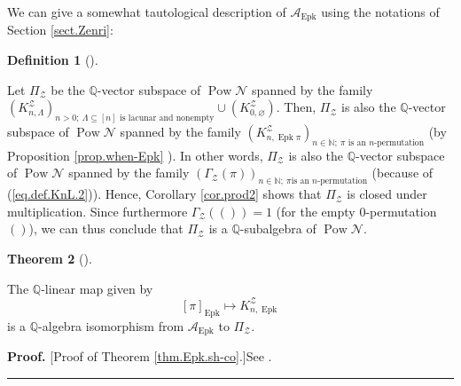 \documentclass[numbers=enddot,12pt,final,onecolumn,notitlepage]{scrartcl}%
\theoremstyle{definition}
\newtheorem{theo}{Theorem}[section]
\newenvironment{theorem}[1][]
{\begin{theo}[#1]\begin{leftbar}}
{\end{leftbar}\end{theo}}
\newtheorem{defi}[theo]{Definition}
\newenvironment{definition}[1][]
{\begin{defi}[#1]\begin{leftbar}}
{\end{leftbar}\end{defi}}
\newenvironment{proof}[1][Proof]{\noindent\textbf{#1.} }{\ \rule{0.5em}{0.5em}}
\newenvironment{vershort}{}{}
\begin{document}
We can give a somewhat tautological description of $\mathcal{A}%
_{\operatorname*{Epk}}$ using the notations of Section \ref{sect.Zenri}:

\begin{definition}
Let $\Pi_{\mathcal{Z}}$ be the $\mathbb{Q}$-vector subspace of
$\operatorname*{Pow}\mathcal{N}$ spanned by the family $\left(  K_{n,\Lambda
}^{\mathcal{Z}}\right)  _{n>0;\ \Lambda\subseteq\left[  n\right]  \text{ is
lacunar and nonempty}}\cup\left(  K_{0,\varnothing}^{\mathcal{Z}}\right)  $.
Then, $\Pi_{\mathcal{Z}}$ is also the $\mathbb{Q}$-vector subspace of
$\operatorname*{Pow}\mathcal{N}$ spanned by the family $\left(
K_{n,\operatorname*{Epk}\pi}^{\mathcal{Z}}\right)  _{n\in\mathbb{N}%
;\ \pi\text{ is an }n\text{-permutation}}$ (by Proposition \ref{prop.when-Epk}%
). In other words, $\Pi_{\mathcal{Z}}$ is also the $\mathbb{Q}$-vector
subspace of $\operatorname*{Pow}\mathcal{N}$ spanned by the family $\left(
\Gamma_{\mathcal{Z}}\left(  \pi\right)  \right)  _{n\in\mathbb{N};\ \pi\text{
is an }n\text{-permutation}}$ (because of (\ref{eq.def.KnL.2})). Hence,
Corollary \ref{cor.prod2} shows that $\Pi_{\mathcal{Z}}$ is closed under
multiplication. Since furthermore $\Gamma_{\mathcal{Z}}\left(
\left( \right) \right)  =1$ (for the empty $0$-permutation
$\left( \right)$), we can thus conclude that $\Pi
_{\mathcal{Z}}$ is a $\mathbb{Q}$-subalgebra of $\operatorname*{Pow}%
\mathcal{N}$.
\end{definition}

\begin{theorem}
\label{thm.Epk.sh-co}The $\mathbb{Q}$-linear map given by%
\[
\left[  \pi\right]  _{\operatorname*{Epk}}\mapsto K_{n,\operatorname*{Epk}%
}^{\mathcal{Z}}%
\]
is a $\mathbb{Q}$-algebra isomorphism from $\mathcal{A}_{\operatorname*{Epk}}$
to $\Pi_{\mathcal{Z}}$.
\end{theorem}

\begin{vershort}
\begin{proof}
[Proof of Theorem \ref{thm.Epk.sh-co}.]See \cite{verlong}.
\end{proof}
\end{vershort}
\end{document}
